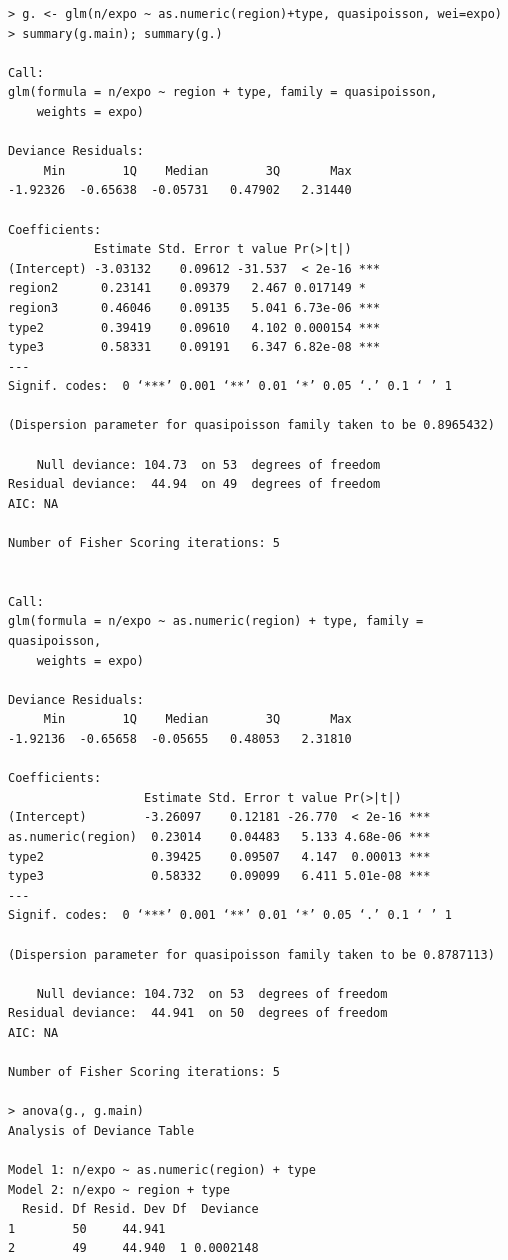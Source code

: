 \documentclass[11pt]{article}
\begin{document}
\begin{verbatim}
> g. <- glm(n/expo ~ as.numeric(region)+type, quasipoisson, wei=expo)
> summary(g.main); summary(g.)

Call:
glm(formula = n/expo ~ region + type, family = quasipoisson, 
    weights = expo)

Deviance Residuals: 
     Min        1Q    Median        3Q       Max  
-1.92326  -0.65638  -0.05731   0.47902   2.31440  

Coefficients:
            Estimate Std. Error t value Pr(>|t|)    
(Intercept) -3.03132    0.09612 -31.537  < 2e-16 ***
region2      0.23141    0.09379   2.467 0.017149 *  
region3      0.46046    0.09135   5.041 6.73e-06 ***
type2        0.39419    0.09610   4.102 0.000154 ***
type3        0.58331    0.09191   6.347 6.82e-08 ***
---
Signif. codes:  0 ‘***’ 0.001 ‘**’ 0.01 ‘*’ 0.05 ‘.’ 0.1 ‘ ’ 1

(Dispersion parameter for quasipoisson family taken to be 0.8965432)

    Null deviance: 104.73  on 53  degrees of freedom
Residual deviance:  44.94  on 49  degrees of freedom
AIC: NA

Number of Fisher Scoring iterations: 5


Call:
glm(formula = n/expo ~ as.numeric(region) + type, family = quasipoisson, 
    weights = expo)

Deviance Residuals: 
     Min        1Q    Median        3Q       Max  
-1.92136  -0.65658  -0.05655   0.48053   2.31810  

Coefficients:
                   Estimate Std. Error t value Pr(>|t|)    
(Intercept)        -3.26097    0.12181 -26.770  < 2e-16 ***
as.numeric(region)  0.23014    0.04483   5.133 4.68e-06 ***
type2               0.39425    0.09507   4.147  0.00013 ***
type3               0.58332    0.09099   6.411 5.01e-08 ***
---
Signif. codes:  0 ‘***’ 0.001 ‘**’ 0.01 ‘*’ 0.05 ‘.’ 0.1 ‘ ’ 1

(Dispersion parameter for quasipoisson family taken to be 0.8787113)

    Null deviance: 104.732  on 53  degrees of freedom
Residual deviance:  44.941  on 50  degrees of freedom
AIC: NA

Number of Fisher Scoring iterations: 5

> anova(g., g.main)
Analysis of Deviance Table

Model 1: n/expo ~ as.numeric(region) + type
Model 2: n/expo ~ region + type
  Resid. Df Resid. Dev Df  Deviance
1        50     44.941             
2        49     44.940  1 0.0002148
\end{verbatim}
\end{document}
